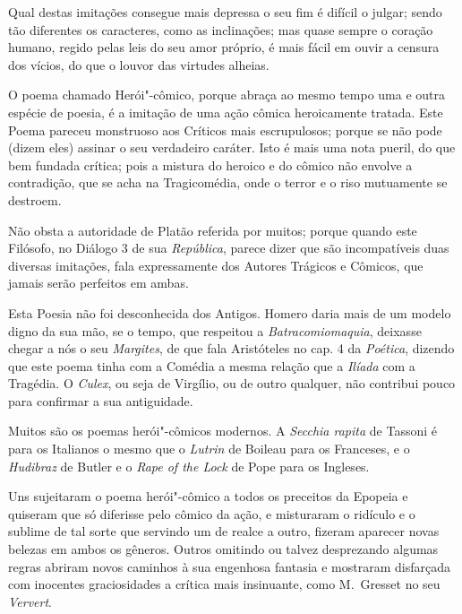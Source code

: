 Qual destas imitações consegue mais depressa o seu fim
é difícil o julgar; sendo tão diferentes os caracteres, 
como as inclinações; mas quase sempre o coração humano,
regido pelas leis do seu amor próprio, é mais fácil em ouvir 
a censura dos vícios, do que o louvor das virtudes alheias.

O poema chamado Herói"-cômico, porque abraça ao mesmo
tempo uma e outra espécie de poesia, é a imitação 
de uma ação cômica heroicamente tratada. 
Este Poema pareceu monstruoso aos Críticos mais escrupulosos; 
porque se não pode (dizem eles) assinar o seu verdadeiro caráter. 
Isto é mais uma nota pueril, do que bem fundada crítica; 
pois a mistura do heroico e do cômico não envolve a
contradição, que se acha na Tragicomédia, onde o terror 
e o riso mutuamente se destroem. 							\index{\Comic}\index{\Heroic}

Não obsta a autoridade de Platão referida por muitos; 					\index{\Plat}
porque quando este Filósofo, no Diálogo 3 de sua \textit{República}, 			\index{\Trag}
parece dizer que são incompatíveis duas diversas imitações, 
fala expressamente dos Autores Trágicos e Cômicos, que jamais
serão perfeitos em ambas. 								\index{\Comic} \index{\Plat} \index{\Repub} \index{\Trag}

Esta Poesia não foi desconhecida dos Antigos.  Homero daria				\index{\Homer}
mais de um modelo digno da sua mão, se o tempo, que
respeitou a \textit{Batracomiomaquia}, deixasse chegar a nós o seu			\index{\Batr}
\textit{Margites}, de que fala								\index{\Margi}
Aristóteles no cap. 4 da \textit{Poética}, dizendo que este poema tinha com a		\index{\Arist}
Comédia a mesma relação que a \textit{Ilíada} com a Tragédia. O
\textit{Culex}, ou seja de Virgílio, ou de outro qualquer, não contribui 
pouco para confirmar a sua antiguidade.							\index{\Culex} \index{\Margi} \index{\Poet} \index{\Trag} %

Muitos são os poemas herói"-cômicos modernos. A \textit{Secchia
rapita} de Tassoni é para os Italianos o mesmo que o \textit{Lutrin}	
de Boileau para os Franceses, e o \textit{Hudibraz} de Butler e o
\textit{Rape of the Lock} de Pope para os Ingleses.					\index{\Secch} \index{\Lutri} \index{\Tasson} %

Uns sujeitaram o poema herói"-cômico a todos os preceitos da 
Epopeia e quiseram que só diferisse pelo cômico da ação,				\index{\Comic} 
e misturaram o ridículo e o sublime de tal sorte que servindo um 
de realce a outro, fizeram aparecer novas belezas em ambos os 
gêneros. Outros omitindo ou talvez desprezando algumas regras
abriram novos caminhos à sua engenhosa fantasia e mostraram
disfarçada com inocentes graciosidades a crítica mais 
insinuante, como M.~Gresset no seu \textit{Ververt}.

